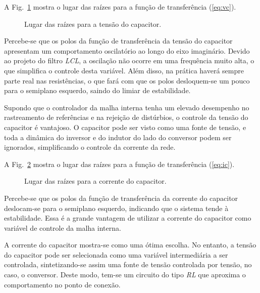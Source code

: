     A Fig.~\ref{fig:rlocus_vc} mostra o lugar das raízes para a função de
    transferência (\ref{eq:vc}).

    \begin{figure}[htb]
        \centering{
           } %
        \renewcommand\figurename{Fig.}
        \caption{Lugar das raízes para a tensão do capacitor.}
        \label{fig:rlocus_vc}
    \end{figure}

    Percebe-se que os polos da função de transferência da tensão do capacitor
    apresentam um comportamento oscilatório ao longo do eixo imaginário. Devido
    ao projeto do filtro \emph{LCL}, a oscilação não ocorre em uma frequência
    muito alta, o que simplifica o controle desta variável. Além disso, na prática
    haverá sempre parte real nas resistências, o que fará com que os polos desloquem-se
    um pouco para o semiplano esquerdo, saindo do limiar de estabilidade.

    Supondo que o controlador da malha interna tenha um elevado desempenho
    no rastreamento de referências e na rejeição de distúrbios,
    o controle da tensão do capacitor é vantajoso. O capacitor
    pode ser visto como uma fonte de tensão, e toda a dinâmica
    do inversor e do indutor do lado do conversor podem ser ignorados,
    simplificando o controle da corrente da rede.

    A Fig.~\ref{fig:rlocus_ic} mostra o lugar das raízes para a função de
    transferência (\ref{eq:ic}).

    \begin{figure}[htb]
        \centering{
            }%
        \renewcommand\figurename{Fig.}
        \caption{Lugar das raízes para a corrente do capacitor.}
        \label{fig:rlocus_ic}
    \end{figure}

    Percebe-se que os polos da função de transferência da corrente do capacitor
    deslocam-se para o semiplano esquerdo, indicando que o sistema tende à
    estabilidade. Essa é a grande vantagem de utilizar a corrente do capacitor
    como variável de controle da malha interna.

    A corrente do capacitor mostra-se como uma ótima escolha. No entanto, a tensão
    do capacitor pode ser selecionada como uma variável intermediária a ser controlada,
    sintetizando-se assim uma fonte de tensão controlada por tensão, no caso, o
    conversor. Deste modo, tem-se um circuito do tipo \emph{RL} que aproxima o
    comportamento no ponto de conexão.

